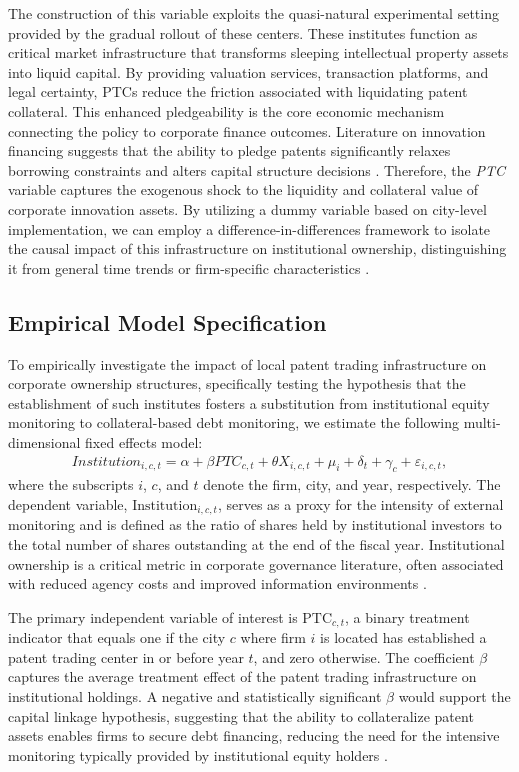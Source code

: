 \documentclass[12pt,a4paper]{article}
\begin{document}
The construction of this variable exploits the quasi-natural experimental setting provided by the gradual rollout of these centers. These institutes function as critical market infrastructure that transforms sleeping intellectual property assets into liquid capital. By providing valuation services, transaction platforms, and legal certainty, PTCs reduce the friction associated with liquidating patent collateral. This enhanced pledgeability is the core economic mechanism connecting the policy to corporate finance outcomes. Literature on innovation financing suggests that the ability to pledge patents significantly relaxes borrowing constraints and alters capital structure decisions \citep{mann2018creditor,hochberg2018patent}. Therefore, the \textit{PTC} variable captures the exogenous shock to the liquidity and collateral value of corporate innovation assets. By utilizing a dummy variable based on city-level implementation, we can employ a difference-in-differences framework to isolate the causal impact of this infrastructure on institutional ownership, distinguishing it from general time trends or firm-specific characteristics \citep{fang2017intellectual}.

\subsection{Empirical Model Specification}
To empirically investigate the impact of local patent trading infrastructure on corporate ownership structures, specifically testing the hypothesis that the establishment of such institutes fosters a substitution from institutional equity monitoring to collateral-based debt monitoring, we estimate the following multi-dimensional fixed effects model:
\begin{align}
\textit{Institution}_{i,c,t} = \alpha + \beta \textit{PTC}_{c,t} + \theta X_{i,c,t} + \mu_i + \delta_t + \gamma_c + \varepsilon_{i,c,t},
\end{align}
where the subscripts $i$, $c$, and $t$ denote the firm, city, and year, respectively. The dependent variable, $\text{Institution}_{i,c,t}$, serves as a proxy for the intensity of external monitoring and is defined as the ratio of shares held by institutional investors to the total number of shares outstanding at the end of the fiscal year. Institutional ownership is a critical metric in corporate governance literature, often associated with reduced agency costs and improved information environments \citep{drobetz2024beyond}.

The primary independent variable of interest is $\text{PTC}_{c,t}$, a binary treatment indicator that equals one if the city $c$ where firm $i$ is located has established a patent trading center in or before year $t$, and zero otherwise. The coefficient $\beta$ captures the average treatment effect of the patent trading infrastructure on institutional holdings. A negative and statistically significant $\beta$ would support the capital linkage hypothesis, suggesting that the ability to collateralize patent assets enables firms to secure debt financing, reducing the need for the intensive monitoring typically provided by institutional equity holders \citep{hochberg2018patent}.
\end{document}

